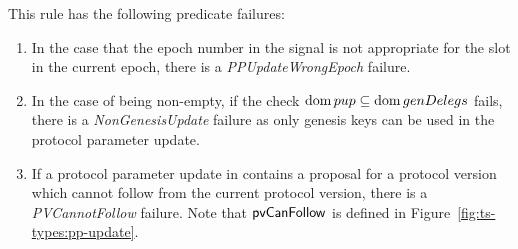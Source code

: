 This rule has the following predicate failures:

\begin{enumerate}
\item In the case that the epoch number in the signal is not appropriate for the
  slot in the current epoch, there is a \emph{PPUpdateWrongEpoch} failure.
\item In the case of  being non-empty, if the check $\operatorname{dom} pup \subseteq
  \operatorname{dom} genDelegs$ fails, there is a \emph{NonGenesisUpdate} failure as only genesis keys
  can be used in the protocol parameter update.
\item If a protocol parameter update in  contains a proposal for a
  protocol version which cannot follow from the current protocol version,
  there is a \emph{PVCannotFollow} failure.
  Note that $\mathsf{pvCanFollow}$ is defined in Figure~\ref{fig:ts-types:pp-update}.
\end{enumerate}

